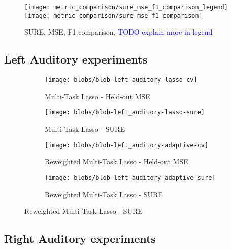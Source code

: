 \begin{figure}[h]
    \centering
    \texttt{[image: metric\_comparison/sure\_mse\_f1\_comparison\_legend]}
    \texttt{[image: metric\_comparison/sure\_mse\_f1\_comparison]}
    \caption{SURE, MSE, F1 comparison, \textcolor{blue}{TODO explain more in legend}}
    \label{fig:sure_mse_f1_comparison}
\end{figure}

\subsection{Left Auditory experiments}

\begin{figure}
    \centering
    \begin{subfigure}{6cm}
        \centering \texttt{[image: blobs/blob-left\_auditory-lasso-cv]}
        \caption{Multi-Task Lasso - Held-out MSE}
    \end{subfigure}
    \begin{subfigure}{6cm}
        \centering \texttt{[image: blobs/blob-left\_auditory-lasso-sure]}
        \caption{Multi-Task Lasso - SURE}
    \end{subfigure}

    \begin{subfigure}{6cm}
        \centering \texttt{[image: blobs/blob-left\_auditory-adaptive-cv]}
        \caption{Reweighted Multi-Task Lasso - Held-out MSE}
    \end{subfigure}
    \begin{subfigure}{6cm}
        \centering \texttt{[image: blobs/blob-left\_auditory-adaptive-sure]}
        \caption{Reweighted Multi-Task Lasso - SURE}
    \end{subfigure}
\end{figure}


\subsection{Right Auditory experiments}

